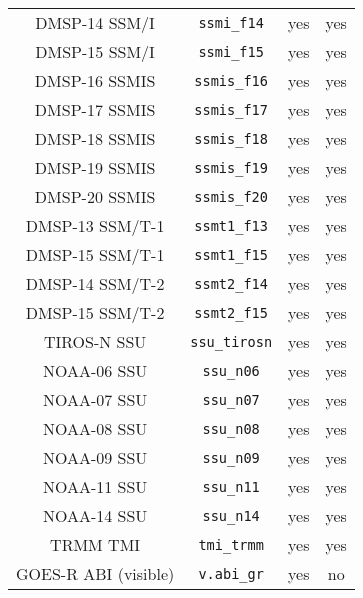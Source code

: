 \begin{center}
\begin{longtable}{c c c c}
  DMSP-14 SSM/I                      & \texttt{ssmi\_f14}           &  yes     &  yes       \\
  DMSP-15 SSM/I                      & \texttt{ssmi\_f15}           &  yes     &  yes       \\
  DMSP-16 SSMIS                      & \texttt{ssmis\_f16}          &  yes     &  yes       \\
  DMSP-17 SSMIS                      & \texttt{ssmis\_f17}          &  yes     &  yes       \\
  DMSP-18 SSMIS                      & \texttt{ssmis\_f18}          &  yes     &  yes       \\
  DMSP-19 SSMIS                      & \texttt{ssmis\_f19}          &  yes     &  yes       \\
  DMSP-20 SSMIS                      & \texttt{ssmis\_f20}          &  yes     &  yes       \\
  DMSP-13 SSM/T-1                    & \texttt{ssmt1\_f13}          &  yes     &  yes       \\
  DMSP-15 SSM/T-1                    & \texttt{ssmt1\_f15}          &  yes     &  yes       \\
  DMSP-14 SSM/T-2                    & \texttt{ssmt2\_f14}          &  yes     &  yes       \\
  DMSP-15 SSM/T-2                    & \texttt{ssmt2\_f15}          &  yes     &  yes       \\
  TIROS-N SSU                        & \texttt{ssu\_tirosn}         &  yes     &  yes       \\ 
  NOAA-06 SSU                        & \texttt{ssu\_n06}            &  yes     &  yes       \\
  NOAA-07 SSU                        & \texttt{ssu\_n07}            &  yes     &  yes       \\
  NOAA-08 SSU                        & \texttt{ssu\_n08}            &  yes     &  yes       \\
  NOAA-09 SSU                        & \texttt{ssu\_n09}            &  yes     &  yes       \\
  NOAA-11 SSU                        & \texttt{ssu\_n11}            &  yes     &  yes       \\
  NOAA-14 SSU                        & \texttt{ssu\_n14}            &  yes     &  yes       \\
  TRMM TMI                           & \texttt{tmi\_trmm}           &  yes     &  yes       \\
  GOES-R ABI (visible)               & \texttt{v.abi\_gr}           &  yes     &  no        \\

\end{longtable}
\end{center}
